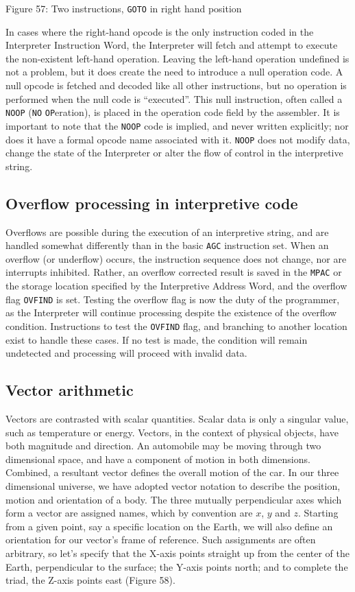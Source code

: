 \documentclass[refcap, oxford]{ahsan}
\begin{document}
Figure 57: Two instructions, \texttt{GOTO} in right hand position

In cases where the right-hand opcode is the only instruction coded in the Interpreter Instruction Word, the Interpreter will fetch and attempt to execute the non-existent left-hand operation. Leaving the left-hand operation undefined is not a problem, but it does create the need to introduce a null operation code. A null opcode is fetched and decoded like all other instructions, but no operation is performed when the null code is ``executed''. This null instruction, often called a \texttt{NOOP} (\texttt{NO} \texttt{OP}eration), is placed in the operation code field by the assembler. It is important to note that the \texttt{NOOP} code is implied, and never written explicitly; nor does it have a formal opcode name associated with it. \texttt{NOOP} does not modify data, change the state of the Interpreter or alter the flow of control in the interpretive string.


\subsection{Overflow processing in interpretive code}
Overflows are possible during the execution of an interpretive string, and are handled somewhat differently than in the basic \texttt{AGC} instruction set. When an overflow (or underflow) occurs, the instruction sequence does not change, nor are interrupts inhibited. Rather, an overflow corrected result is saved in the \texttt{MPAC} or the storage location specified by the Interpretive Address Word, and the overflow flag \texttt{OVFIND} is set. Testing the overflow flag is now the duty of the programmer, as the Interpreter will continue processing despite the existence of the overflow condition. Instructions to test the \texttt{OVFIND} flag, and branching to another location exist to handle these cases. If no test is made, the condition will remain undetected and processing will proceed with invalid data.


\subsection{Vector arithmetic}
Vectors are contrasted with scalar quantities. Scalar data is only a singular value, such as temperature or energy. Vectors, in the context of physical objects, have both magnitude and direction. An automobile may be moving through two dimensional space, and have a component of motion in both dimensions. Combined, a resultant vector defines the overall motion of the car. In our three dimensional universe, we have adopted vector notation to describe the position, motion and orientation of a body. The three mutually perpendicular axes which form a vector are assigned names, which by convention are $x$, $y$ and $z$. Starting from a given point, say a specific location on the Earth, we will also define an orientation for our vector's frame of reference. Such assignments are often arbitrary, so let's specify that the X-axis points straight up from the center of the Earth, perpendicular to the surface; the Y-axis points north; and to complete the triad, the Z-axis points east (Figure 58).
\end{document}

